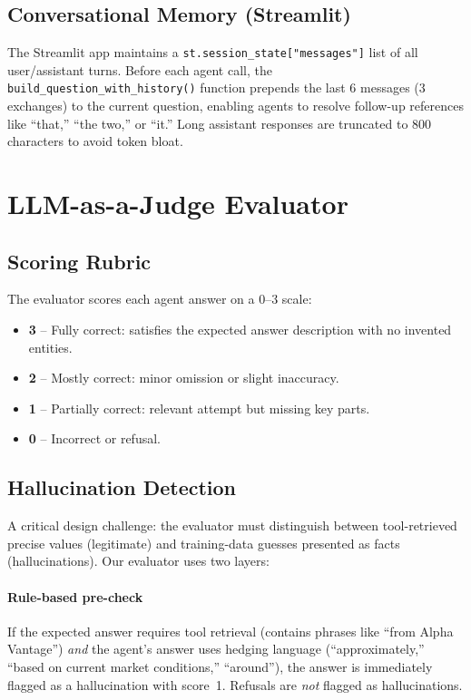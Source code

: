 \documentclass[conference]{IEEEtran}
\begin{document}
\subsection{Conversational Memory (Streamlit)}

The Streamlit app maintains a \texttt{st.session\_state["messages"]} list of all
user/assistant turns.  Before each agent call, the \texttt{build\_question\_with\_history()}
function prepends the last 6 messages (3 exchanges) to the current question, enabling
agents to resolve follow-up references like ``that,'' ``the two,'' or ``it.''
Long assistant responses are truncated to 800 characters to avoid token bloat.

\section{LLM-as-a-Judge Evaluator}

\subsection{Scoring Rubric}

The evaluator scores each agent answer on a 0--3 scale:
\begin{itemize}
  \item \textbf{3} -- Fully correct: satisfies the expected answer description with no
        invented entities.
  \item \textbf{2} -- Mostly correct: minor omission or slight inaccuracy.
  \item \textbf{1} -- Partially correct: relevant attempt but missing key parts.
  \item \textbf{0} -- Incorrect or refusal.
\end{itemize}

\subsection{Hallucination Detection}

A critical design challenge: the evaluator must distinguish between tool-retrieved precise
values (legitimate) and training-data guesses presented as facts (hallucinations).
Our evaluator uses two layers:

\paragraph{Rule-based pre-check}
If the expected answer requires tool retrieval (contains phrases like ``from Alpha Vantage'')
\emph{and} the agent's answer uses hedging language (``approximately,'' ``based on current
market conditions,'' ``around''), the answer is immediately flagged as a hallucination
with score~1.  Refusals are \emph{not} flagged as hallucinations.
\end{document}
